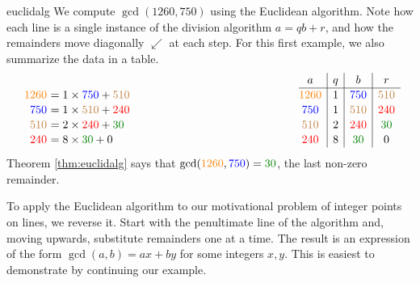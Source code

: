 \begin{example}{}{euclidalg}
	We compute $\gcd(1260,750)$ using the Euclidean algorithm. Note how each line is a single instance of the division algorithm $a=qb+r$, and how the remainders move diagonally $\swarrow$ at each step. For this first example, we also summarize the data in a table.
	\[
		\renewcommand{\arraystretch}{1.1}
		\begin{array}{r@{\,\,}l@{\hspace{150pt}}c|c|c|c}
			& & a & q & b & r \\\cline{3-6}
			\textcolor{orange}{1260} & =1\times\textcolor{blue}{750}+\textcolor{brown}{510} & \textcolor{orange}{1260}& 1 & \textcolor{blue}{750} & \textcolor{brown}{510}\\
			\textcolor{blue}{750} & =1\times\textcolor{brown}{510}+\textcolor{red}{240} & \textcolor{blue}{750}& 1 & \textcolor{brown}{510} & \textcolor{red}{240}\\
			\textcolor{brown}{510} & =2\times\textcolor{red}{240}+\textcolor{Green}{30} & \textcolor{brown}{510} & 2 & \textcolor{red}{240} & \textcolor{Green}{30}\\
			\textcolor{red}{240} & =8\times\textcolor{Green}{30}+0 & \textcolor{red}{240} & 8 & \textcolor{Green}{30} & 0
		\end{array}
	\]
	Theorem \ref{thm:euclidalg} says that $\gcd(\textcolor{orange}{1260},\textcolor{blue}{750})=\textcolor{Green}{30}$, the last non-zero remainder.
\end{example}

\goodbreak



To apply the Euclidean algorithm to our motivational problem of integer points on lines, we reverse it. Start with the penultimate line of the algorithm and, moving upwards, substitute remainders one at a time. The result is an expression of the form $\gcd(a,b)=ax+by$ for some integers $x,y$. This is easiest to demonstrate by continuing our example.

